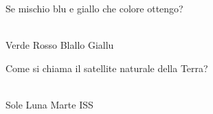 \documentclass[a4paper,11pt]{exam}
\begin{document}
\begin{questions}
    
\question Se mischio blu e giallo che colore ottengo?\\\
\begin{oneparchoices}
  \choice Verde
  \choice Rosso
  \choice Blallo
  \choice Giallu
\end{oneparchoices}

    
\question Come si chiama il satellite naturale della Terra?\\\
\begin{oneparchoices}
  \choice Sole
  \choice Luna
  \choice Marte
  \choice ISS
\end{oneparchoices}

    
\end{questions}

    
    \newpage
    
    
\end{document}
